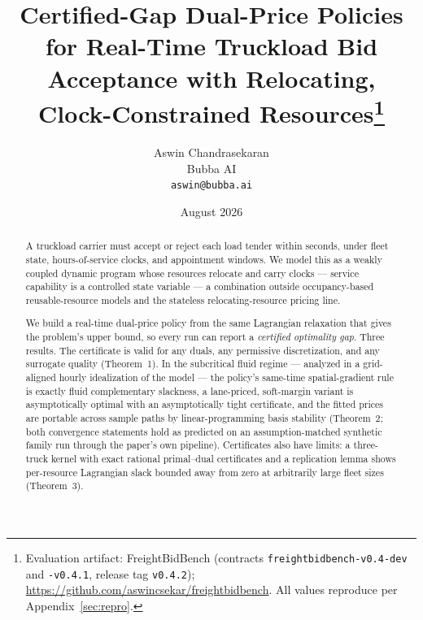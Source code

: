 \documentclass[11pt]{article}
\title{Certified-Gap Dual-Price Policies for Real-Time Truckload Bid
Acceptance with Relocating, Clock-Constrained
Resources\thanks{Evaluation artifact: FreightBidBench
(contracts \texttt{freightbidbench-v0.4-dev} and
\texttt{-v0.4.1}, release tag \texttt{v0.4.2});
\url{https://github.com/aswincsekar/freightbidbench}. All values
reproduce per Appendix~\ref{sec:repro}.}}
\author{Aswin Chandrasekaran \\ Bubba AI \\ \texttt{aswin@bubba.ai}}
\date{August 2026}
\begin{document}
\maketitle

\begin{abstract}
A truckload carrier must accept or reject each load tender within
seconds, under fleet state, hours-of-service clocks, and appointment
windows. We model this as a weakly coupled dynamic program whose
resources relocate and carry clocks --- service capability is a
controlled state variable --- a combination outside occupancy-based
reusable-resource models and the stateless relocating-resource
pricing line.

We build a real-time dual-price policy from the same Lagrangian
relaxation that gives the problem's upper bound, so every run can
report a \emph{certified optimality gap}. Three results. The certificate is
valid for any duals, any permissive discretization, and any surrogate
quality (Theorem~1). In the subcritical fluid regime --- analyzed in a
grid-aligned hourly idealization of the model --- the policy's same-time
spatial-gradient rule is exactly fluid complementary slackness, a
lane-priced, soft-margin variant is asymptotically optimal with an
asymptotically tight certificate, and the fitted prices are portable
across sample paths by linear-programming basis stability (Theorem~2;
both convergence statements hold as predicted on an
assumption-matched synthetic family run through the paper's own
pipeline).
Certificates also have limits: a three-truck kernel with exact
rational primal--dual certificates and a replication lemma shows
per-resource Lagrangian slack bounded away from zero at arbitrarily
large fleet sizes (Theorem~3).


\end{abstract}
\end{document}
